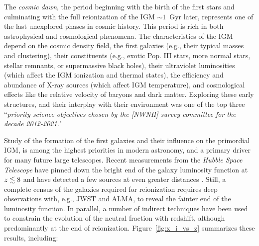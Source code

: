 \documentclass[preprint]{aastex}
\begin{document}
The {\it cosmic dawn}, the period beginning with the birth of the first stars and culminating with the full
reionization of the IGM 
$\sim 1$~Gyr later, represents one of the last unexplored phases in cosmic history. 
This period is rich in both astrophysical and cosmological phenomena. 
The characteristics of the IGM depend on the cosmic density field, the first galaxies (e.g., their typical masses and 
clustering), their constituents (e.g., exotic Pop. III 
stars, more normal stars, stellar remnants, or supermassive black holes), their ultraviolet luminosities (which affect
the IGM ionization and thermal states), the efficiency and abundance of X-ray sources (which affect IGM temperature), 
and cosmological effects like the relative velocity of baryons and dark matter. 
Exploring these early structures, and their interplay with their environment was one of the top three ``{\it priority science objectives chosen by 
the [NWNH] survey committee for the decade 2012-2021.}"


Study of the formation of the first galaxies and their influence on the primordial IGM, is 
among the highest priorities in modern astronomy, 
and a primary driver for many future large telescopes.  Recent measurements from the {\it Hubble Space Telescope} 
have pinned down the bright end of the galaxy luminosity function 
at $z \lesssim 8$ \citep{bouwens_et_al2010, schenker_et_al2013} and have detected a few sources at even greater 
distances \citep{ellis_et_al2013, oesch_et_al2013}. Still, a complete census of the galaxies required for
reionization requires deep observations with, e.g., JWST and ALMA, to reveal the fainter end of the luminosity function. 
In parallel, a number of indirect techniques have been used to constrain the evolution of the neutral fraction
with redshift, although predominantly at the end of reionization. Figure~\ref{fig:x_i_vs_z} summarizes 
these results, including: 
\end{document}

